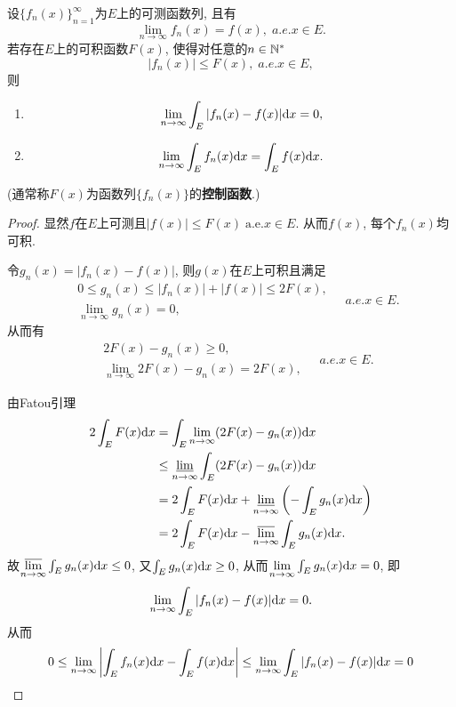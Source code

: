 \begin{theorem}[Lebesgue控制收敛定理]\label{thm:Ldc}
	设$\{ f_n(x) \}_{n=1}^{\infty}$为$E$上的可测函数列, 且有
	$$
		\lim\limits_{n \to \infty} f_n(x) = f(x), \; a.e. x \in E.
	$$
	若存在$E$上的可积函数$F(x)$, 使得对任意的$n \in \mathbb{N}^*$
	$$
		|f_n(x)| \leq F(x), \; a.e. x \in E ,
	$$
	则
	\begin{enumerate}
		\item 
		\begin{equation}
			\lim\limits_{n\to\infty}\int_E |f_n(x) - f(x)| \mathrm{d} x = 0,
		\end{equation}
		
		\item 
		\begin{equation}
			\lim\limits_{n\to\infty}\int_E f_n(x) \mathrm{d} x = \int_E f(x)\mathrm{d} x.
		\end{equation}
	\end{enumerate}
	
	(通常称$F(x)$为函数列$\{ f_n(x) \}$的\textbf{控制函数}.)
\end{theorem}
\begin{proof} 
	 \par 
	显然$f$在$E$上可测且$|f(x)| \leq F(x) \;\text{a.e.} x\in E$. 
	从而$f(x)$, 每个$f_n(x)$均可积. 
	
	令$g_n(x) = |f_n(x) - f(x)|$, 则$g(x)$在$E$上可积且满足
	$$
	\begin{aligned}
		& 0 \leq g_n(x) \leq |f_n(x)| + |f(x)| \leq 2F(x), \\ 
		& \lim\limits_{n \to \infty} g_n(x) = 0, 
	\end{aligned}
		 \quad a.e. x \in E.
	$$
	从而有
	$$
	\begin{aligned}
		& 2F(x) - g_n(x) \geq 0, \\ 
		& \lim\limits_{n \to \infty} 2F(x) - g_n(x) = 2F(x), 
	\end{aligned}
		 \quad a.e. x \in E.
	$$
	 \par
	由Fatou引理
	$$
	\begin{aligned}
		2 \int_E F(x) \mathrm{d} x
		&= \int_E \lim\limits_{n \to \infty} (2F(x) - g_n(x)) \mathrm{d} x \\
		&\leq \varliminf\limits_{n \to \infty} \int_E (2F(x) - g_n(x)) \mathrm{d} x \\
		&= 2 \int_E F(x) \mathrm{d} x + \varliminf\limits_{n \to \infty} \left(- \int_E g_n(x) \mathrm{d} x \right) \\
		&= 2 \int_E F(x) \mathrm{d} x - \varlimsup\limits_{n \to \infty} \int_E g_n(x) \mathrm{d} x.
	\end{aligned}
	$$
	故$\varlimsup\limits_{n \to \infty} \int_E g_n(x) \mathrm{d} x \leq 0$,
	又$\int_E g_n(x) \mathrm{d} x \geq 0$, 
	从而$\lim\limits_{n \to \infty} \int_E g_n(x) \mathrm{d} x = 0$, 
	即
	$$
		\lim\limits_{n \to \infty} \int_E |f_n(x) - f(x)| \mathrm{d} x = 0.
	$$
	从而
	$$
		0 \leq 
		\lim\limits_{n \to \infty} \left| \int_E f_n(x) \mathrm{d} x - \int_E f(x) \mathrm{d} x \right|
		\leq \lim\limits_{n \to \infty} \int_E |f_n(x) - f(x)| \mathrm{d} x = 0
	$$
\end{proof}

